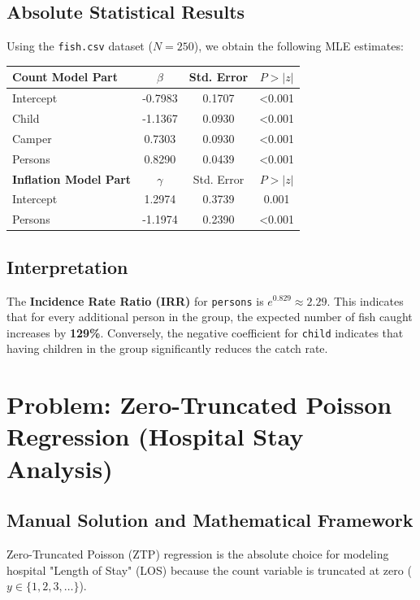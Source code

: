 \documentclass[12pt, a4paper]{article}
\begin{document}
\subsection{Absolute Statistical Results}
Using the \texttt{fish.csv} dataset ($N=250$), we obtain the following MLE estimates:

\begin{table}[h!]
\centering
\begin{tabular}{lccc}
\toprule
\textbf{Count Model Part} & $\beta$ & Std. Error & $P > |z|$ \\ \midrule
Intercept & -0.7983 & 0.1707 & <0.001 \\
Child & -1.1367 & 0.0930 & <0.001 \\
Camper & 0.7303 & 0.0930 & <0.001 \\
Persons & 0.8290 & 0.0439 & <0.001 \\ \midrule
\textbf{Inflation Model Part} & $\gamma$ & Std. Error & $P > |z|$ \\ \midrule
Intercept & 1.2974 & 0.3739 & 0.001 \\
Persons & -1.1974 & 0.2390 & <0.001 \\ \bottomrule
\end{tabular}
\end{table}

\subsection{Interpretation}
The \textbf{Incidence Rate Ratio (IRR)} for \texttt{persons} is $e^{0.829} \approx 2.29$. This indicates that for every additional person in the group, the expected number of fish caught increases by \textbf{129\%}. Conversely, the negative coefficient for \texttt{child} indicates that having children in the group significantly reduces the catch rate.

\newpage
\section{Problem: Zero-Truncated Poisson Regression (Hospital Stay Analysis)}
\label{prob_ztp}

\subsection{Manual Solution and Mathematical Framework}
Zero-Truncated Poisson (ZTP) regression is the absolute choice for modeling hospital "Length of Stay" (LOS) because the count variable is truncated at zero ($y \in \{1, 2, 3, \dots\}$).
\end{document}
